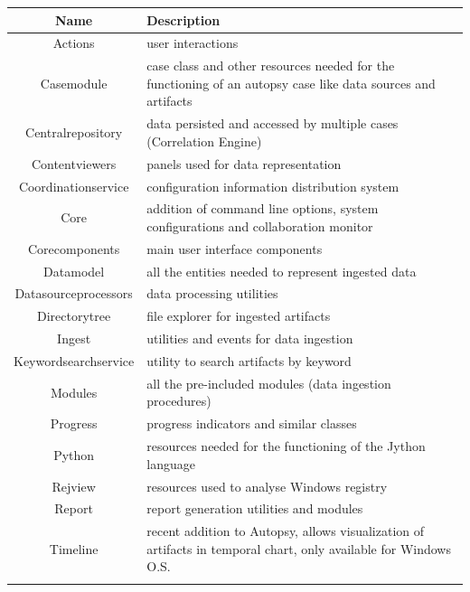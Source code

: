 \pagebreak

\begin{tabularx}{\textwidth}{@{}|c| *1{>{\centering\arraybackslash}X}@{}|}
    \hline
    \textbf{Name} & \textbf{Description} \\
    \hline\hline
    Actions & user interactions  \\
    \hline
    Casemodule & case class and other resources needed for the functioning of an autopsy case like data sources and artifacts \\
    \hline
    Centralrepository & data persisted and accessed by multiple cases (Correlation Engine) \\
    \hline
    Contentviewers & panels used for data representation  \\
    \hline
    Coordinationservice & configuration information distribution system \\
    \hline
    Core & addition of command line options, system configurations and collaboration monitor  \\
    \hline
    Corecomponents & main user interface components \\
    \hline
    Datamodel & all the entities needed to represent ingested data \\
    \hline
    Datasourceprocessors & data processing utilities  \\
    \hline
    Directorytree & file explorer for ingested artifacts \\
    \hline
    Ingest & utilities and events for data ingestion  \\
    \hline
    Keywordsearchservice & utility to search artifacts by keyword  \\
    \hline
    Modules & all the pre-included modules (data ingestion procedures) \\
    \hline
    Progress & progress indicators and similar classes \\
    \hline
    Python & resources needed for the functioning of the Jython language \\
    \hline
    Rejview & resources used to analyse Windows registry \\
    \hline
    Report & report generation utilities and modules \\
    \hline
    Timeline & recent addition to Autopsy, allows visualization of artifacts in temporal chart, only available for Windows O.S. \\
    \hline
    \caption{Autopsy Modules Overview}
    \label{tab:autopsyOverview}
\end{tabularx}


